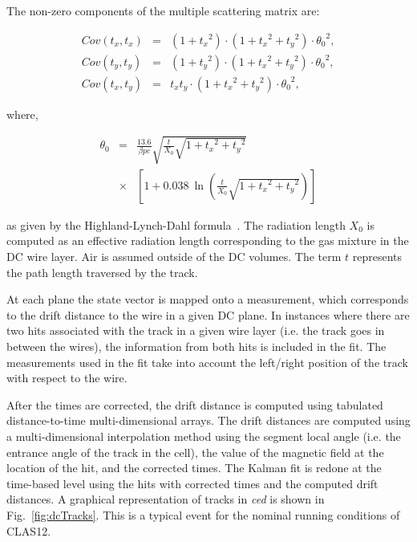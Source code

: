 The non-zero components of the multiple scattering matrix are:

\begin{eqnarray}
Cov (t_x , t_x) &=& (1+{t_x}^2 )\cdot (1+{t_x}^2 + {t_y}^2 )\cdot {\theta_0}^2 , \nonumber \\
Cov (t_y , t_y) &=& (1+{t_y}^2 )\cdot (1+{t_x}^2 + {t_y}^2 )\cdot {\theta_0}^2 , \nonumber \\
Cov (t_x , t_y) &=&  t_x t_y\cdot (1+{t_x}^2 + {t_y}^2 )\cdot {\theta_0}^2 ,
\end{eqnarray}

\noindent
where,

\begin{eqnarray}
  {\theta_0} &=& \frac{13.6}{\beta pc}\sqrt{\frac{t}{X_0}\sqrt{1+{t_x}^2+{t_y}^2}}\\
  &\times&\left[ {1+0.038~\ln \left({\frac{t}{X_0}\sqrt{1+{t_x}^2+{t_y}^2}}\right) }\right] \nonumber
\end{eqnarray}

\noindent
as given by the Highland-Lynch-Dahl formula~\cite{Highland-Lynch-Dahl}. The radiation length $X_0$ is computed
as an effective radiation length corresponding to the gas mixture in the DC wire layer. Air is assumed outside of
the DC volumes. The term $t$ represents the path length traversed by the track.

At each plane the state vector is mapped onto a measurement, which corresponds to the drift distance to the
wire in a given DC plane.  In instances where there are two hits associated with the track in a given wire layer
(i.e. the track goes in between the wires), the information from both hits is included in the fit. The measurements
used in the fit take into account the left/right position of the track with respect to the wire.


After the times are corrected, the drift distance is computed using tabulated distance-to-time multi-dimensional
arrays. The drift distances are computed using a multi-dimensional interpolation method using the segment local
angle (i.e. the entrance angle of the track in the cell), the value of the magnetic field at the location of the hit, and
the corrected times. 
The Kalman fit is redone at the time-based level using the hits with corrected times and the
computed drift distances. A graphical representation of tracks in {\it ced} is shown in Fig.~\ref{fig:dcTracks}. This
is a typical event for the nominal running conditions of CLAS12. 

